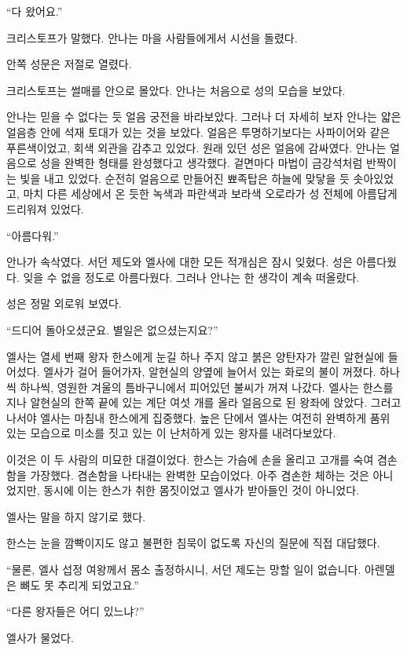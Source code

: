 ``다 왔어요.''

크리스토프가 말했다. 안나는 마을 사람들에게서 시선을 돌렸다.

안쪽 성문은 저절로 열렸다.

크리스토프는 썰매를 안으로 몰았다. 안나는 처음으로 성의 모습을 보았다.

안나는 믿을 수 없다는 듯 얼음 궁전을 바라보았다. 그러나 더 자세히 보자 안나는 얇은 얼음층 안에 석재 토대가 있는 것을 보았다. 얼음은 투명하기보다는 사파이어와 같은 푸른색이었고, 회색 외관을 감추고 있었다. 원래 있던 성은 얼음에 감싸였다. 안나는 얼음으로 성을 완벽한 형태를 완성했다고 생각했다. 겉면마다 마법이 금강석처럼 반짝이는 빛을 내고 있었다. 순전히 얼음으로 만들어진 뾰족탑은 하늘에 맞닿을 듯 솟아있었고, 마치 다른 세상에서 온 듯한 녹색과 파란색과 보라색 오로라가 성 전체에 아름답게 드리워져 있었다.

``아름다워.''

안나가 속삭였다. 서던 제도와 엘사에 대한 모든 적개심은 잠시 잊혔다. 성은 아름다웠다. 잊을 수 없을 정도로 아름다웠다. 그러나 안나는 한 생각이 계속 떠올랐다.

성은 정말 외로워 보였다.

\textbreak

\forceindent``드디어 돌아오셨군요. 별일은 없으셨는지요?''

엘사는 열세 번째 왕자 한스에게 눈길 하나 주지 않고 붉은 양탄자가 깔린 알현실에 들어섰다. 엘사가 걸어 들어가자, 알현실의 양옆에 늘어서 있는 화로의 불이 꺼졌다. 하나씩 하나씩, 영원한 겨울의 틈바구니에서 피어있던 불씨가 꺼져 나갔다. 엘사는 한스를 지나 알현실의 한쪽 끝에 있는 계단 여섯 개를 올라 얼음으로 된 왕좌에 앉았다. 그러고 나서야 엘사는 마침내 한스에게 집중했다. 높은 단에서 엘사는 여전히 완벽하게 품위 있는 모습으로 미소를 짓고 있는 이 난처하게 있는 왕자를 내려다보았다.

이것은 이 두 사람의 미묘한 대결이었다. 한스는 가슴에 손을 올리고 고개를 숙여 겸손함을 가장했다. 겸손함을 나타내는 완벽한 모습이었다. 아주 겸손한 체하는 것은 아니었지만, 동시에 이는 한스가 취한 몸짓이었고 엘사가 받아들인 것이 아니었다.

엘사는 말을 하지 않기로 했다.

한스는 눈을 깜빡이지도 않고 불편한 침묵이 없도록 자신의 질문에 직접 대답했다.

``물론, 엘사 섭정 여왕께서 몸소 출정하시니, 서던 제도는 망할 일이 없습니다. 아렌델은 뼈도 못 추리게 되었고요.''

``다른 왕자들은 어디 있느냐?''

엘사가 물었다.

